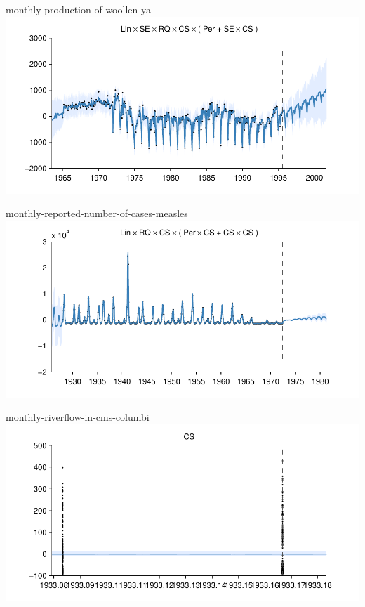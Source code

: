 \begin{frame}{monthly-production-of-woollen-ya}
  \center
  \includegraphics[width=1.0\textwidth]{figures/monthly-production-of-woollen-ya/monthly-production-of-woollen-ya_all}
\end{frame}  
    
\begin{frame}{monthly-reported-number-of-cases-measles}
  \center
  \includegraphics[width=1.0\textwidth]{figures/monthly-reported-number-of-cases-measles/monthly-reported-number-of-cases-measles_all}
\end{frame}  
    
\begin{frame}{monthly-riverflow-in-cms-columbi}
  \center
  \includegraphics[width=1.0\textwidth]{figures/monthly-riverflow-in-cms-columbi/monthly-riverflow-in-cms-columbi_all}
\end{frame}  
    
